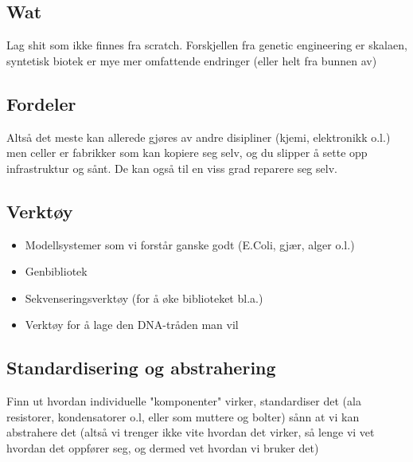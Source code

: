 \subsection{Wat}
    Lag shit som ikke finnes fra scratch. 
    Forskjellen fra genetic engineering er skalaen, syntetisk biotek er mye mer omfattende endringer (eller helt fra bunnen av)

\subsection{Fordeler}
    Altså det meste kan allerede gjøres av andre disipliner (kjemi, elektronikk o.l.)
    men celler er fabrikker som kan kopiere seg selv, og du slipper å sette opp infrastruktur og sånt.
    De kan også til en viss grad reparere seg selv.

\subsection{Verktøy}
    \begin{itemize}
        \item Modellsystemer som vi forstår ganske godt (E.Coli, gjær, alger o.l.)
        \item Genbibliotek
        \item Sekvenseringsverktøy (for å øke biblioteket bl.a.)
        \item Verktøy for å lage den DNA-tråden man vil
    \end{itemize}

\subsection{Standardisering og abstrahering}
    Finn ut hvordan individuelle "komponenter" virker, standardiser det (ala resistorer, kondensatorer o.l, eller som muttere og bolter)
    sånn at vi kan abstrahere det 
    (altså vi trenger ikke vite hvordan det virker, så lenge vi vet hvordan det oppfører seg, og dermed vet hvordan vi bruker det)
